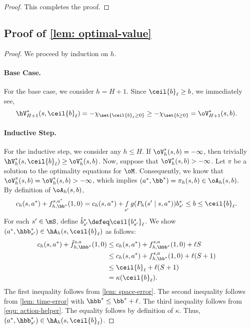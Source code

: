 \documentclass[pdftex, a4paper, 12pt]{article}
\newcommand{\round}[2]{\ceil{#2}_{#1}}
\newcommand{\hb}{\hat{b}}
\newcommand{\hf}{\hat{f}}
\DeclareMathOperator*{\f}{\mathit{f}}
\begin{document}
\begin{proof}
    This completes the proof.
\end{proof}


\subsection{Proof of \texorpdfstring{\cref{lem: optimal-value}}{lem: optimal-value}}

\begin{proof}
    We proceed by induction on $h$.

    \paragraph{Base Case.} For the base case, we consider $h = H+1$. Since $\round{\ell}{b} \geq b$, we immediately see,
    \begin{equation}
        \hV_{H+1}^*(s,\round{\ell}{b}) = -\chi_{\set{\round{\ell}{b} \geq 0}} \geq -\chi_{\set{b \geq 0}} = \oV^*_{H+1}(s,b).
    \end{equation}

    \paragraph{Inductive Step.} For the inductive step, we consider any $h \leq H$. If $\oV^*_h(s,b) = -\infty$, then trivially $\hV^*_h(s,\round{\ell}{b}) \geq \oV^*_h(s, b)$. Now, suppose that $\oV^*_h(s,b) > -\infty$. Let $\pi$ be a solution to the optimality equations for $\oM$. Consequently, we know that $\oV_h^{\pi}(s,b) = \oV^*_h(s,b) > -\infty$, which implies $(a^*,\bb^*) = \pi_h(s,b) \in \oA_h(s,b)$.
    By definition of $\oA_h(s,b)$,
    \begin{equation}\label{equ: action-helper}
        c_h(s,a^*) + f^{s,a^*}_{h, \bb^*}(1, 0) = c_h(s,a^*) + \f_{s'} g(P_h(s' \mid s,a^*)) b_{s'}^* \leq b \leq \round{\ell}{b}.
    \end{equation}
    For each $s' \in \mS$, define $\hb_{s'}^* \defeq \round{\ell}{b_{s'}^*}$. We show $(a^*, \hbb_{s'}^*) \in \hA_h(s, \round{\ell}{b})$ as follows:
    \begin{align*}
        c_h(s,a^*) + \hf_{h,\hbb^*}^{s,a}(1,0) &\leq c_h(s,a^*) + f_{h,\hbb^*}^{s,a}(1,0) + \ell S \\
        &\leq c_h(s,a^*) + f_{h,\bb^*}^{s,a}(1,0) + \ell (S+1) \\
        &\leq \round{\ell}{b} + \ell (S+1) \\
        &= \kappa(\round{\ell}{b}).
    \end{align*}
    The first inequality follows from \cref{lem: space-error}. The second inequality follows from \cref{lem: time-error} with $\hbb^* \leq \bb^* + \ell$. The third inequality follows from \eqref{equ: action-helper}. The equality follows by definition of $\kappa$. Thus, $(a^*, \hbb_{s'}^*) \in \hA_h(s, \round{\ell}{b})$.


\end{proof}
\end{document}

